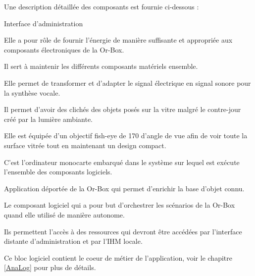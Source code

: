 Une description détaillée des composants est fournie ci-dessous :
\begin{labeling}[~--]{Interface d'administration}
	\item [Alimentation électrique] Elle a pour rôle de fournir l'énergie de manière suffisante et appropriée aux composants électroniques de la Or-Box.
	\item [Boitier mécanique] Il sert à maintenir les différents composants matériels ensemble.
	\item [Gestion du son] Elle permet de transformer et d'adapter le signal électrique en signal sonore pour la synthèse vocale.
	\item [Éclairage] Il permet d'avoir des clichés des objets posés sur la vitre malgré le contre-jour créé par la lumière ambiante.
	\item [Caméra] Elle est équipée d'un objectif fish-eye de 170 \degree d'angle de vue afin de voir toute la surface vitrée tout en maintenant un design compact.
	\item [Raspberry Pi] C'est l'ordinateur monocarte embarqué dans le système sur lequel est exécute l'ensemble des composants logiciels.
	\item [Interface d'administration] Application déportée de la Or-Box qui permet d'enrichir la base d'objet connu.
	\item [IHM Locale] Le composant logiciel qui a pour but d'orchestrer les scénarios de la Or-Box quand elle utilisé de manière autonome.
	\item [Web Services] Ils permettent l'accès à des ressources qui devront être accédées par l'interface distante d'administration et par l'IHM locale.
	\item [Image Processing \& ML]  Ce bloc logiciel contient le coeur de métier de l'application, voir le chapitre \ref{AnaLog} pour plus de détails.
\end{labeling}

